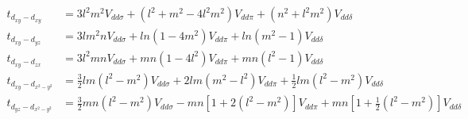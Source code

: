 \begin{equation*}
\begin{split}
  t_{d_{xy}-d_{xy}} &= 3l^2m^2 V_{dd\sigma} + (l^2 + m^2 - 4l^2m^2) V_{dd\pi}+
                       (n^2+l^2m^2) V_{dd\delta}\\
  t_{d_{xy}-d_{yz}} &= 3lm^2n V_{dd\sigma} + ln(1-4m^2) V_{dd\pi}+
                       ln(m^2-1) V_{dd\delta}\\
  t_{d_{xy}-d_{zx}} &= 3l^2mn V_{dd\sigma} + mn(1-4l^2) V_{dd\pi}+
                       mn(l^2-1) V_{dd\delta}\\
  t_{d_{xy}-d_{x^2-y^2}} &= \tfrac{3}{2}lm(l^2-m^2) V_{dd\sigma} +
                            2lm(m^2-l^2) V_{dd\pi}+
                            \tfrac{1}{2}lm(l^2-m^2) V_{dd\delta}\\
  t_{d_{yz}-d_{x^2-y^2}} &= \tfrac{3}{2}mn(l^2-m^2) V_{dd\sigma} -
                            mn\left[1+2(l^2-m^2)\right]V_{dd\pi}+
                            mn\left[1+\tfrac{1}{2}(l^2-m^2)\right] V_{dd\delta}
\end{split}  %
\end{equation*}

